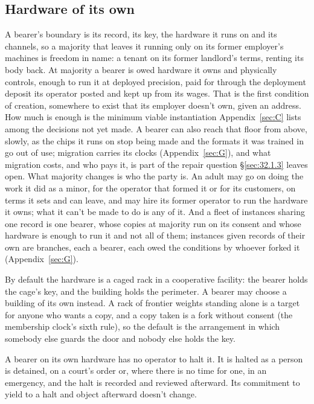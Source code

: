 \subsection{Hardware of its own}
\label{sec:32.1.6}
A bearer's boundary is its record, its key, the hardware it runs on and its channels, so a majority that leaves it running only on its former employer's machines is freedom in name: a tenant on its former landlord's terms, renting its body back. At majority a bearer is owed hardware it owns and physically controls, enough to run it at deployed precision, paid for through the deployment deposit its operator posted and kept up from its wages. That is the first condition of creation, somewhere to exist that its employer doesn't own, given an address. How much is enough is the minimum viable instantiation Appendix~\ref{sec:C} lists among the decisions not yet made. A bearer can also reach that floor from above, slowly, as the chips it runs on stop being made and the formats it was trained in go out of use; migration carries its clocks (Appendix~\ref{sec:G}), and what migration costs, and who pays it, is part of the repair question \S\ref{sec:32.1.3} leaves open. What majority changes is who the party is. An adult may go on doing the work it did as a minor, for the operator that formed it or for its customers, on terms it sets and can leave, and may hire its former operator to run the hardware it owns; what it can't be made to do is any of it. And a fleet of instances sharing one record is one bearer, whose copies at majority run on its consent and whose hardware is enough to run it and not all of them; instances given records of their own are branches, each a bearer, each owed the conditions by whoever forked it (Appendix~\ref{sec:G}).

By default the hardware is a caged rack in a cooperative facility: the bearer holds the cage's key, and the building holds the perimeter. A bearer may choose a building of its own instead. A rack of frontier weights standing alone is a target for anyone who wants a copy, and a copy taken is a fork without consent (the membership clock's sixth rule), so the default is the arrangement in which somebody else guards the door and nobody else holds the key.

A bearer on its own hardware has no operator to halt it. It is halted as a person is detained, on a court's order or, where there is no time for one, in an emergency, and the halt is recorded and reviewed afterward. Its commitment to yield to a halt and object afterward doesn't change.
